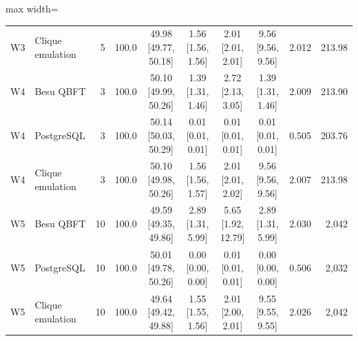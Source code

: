 \begin{table}[t]
\begin{adjustbox}{max width=\textwidth}
\begin{tabular}{llrrcccccr}
W3 & Clique emulation & 5 & 100.0 & 49.98 [49.77, 50.18] & 1.56 [1.56, 1.56] & 2.01 [2.01, 2.01] & 9.56 [9.56, 9.56] & 2.012 & 213.98 \\
W4 & Besu QBFT & 3 & 100.0 & 50.10 [49.99, 50.26] & 1.39 [1.31, 1.46] & 2.72 [2.13, 3.05] & 1.39 [1.31, 1.46] & 2.009 & 213.90 \\
W4 & PostgreSQL & 3 & 100.0 & 50.14 [50.03, 50.29] & 0.01 [0.01, 0.01] & 0.01 [0.01, 0.01] & 0.01 [0.01, 0.01] & 0.505 & 203.76 \\
W4 & Clique emulation & 3 & 100.0 & 50.10 [49.98, 50.26] & 1.56 [1.56, 1.57] & 2.01 [2.01, 2.02] & 9.56 [9.56, 9.56] & 2.007 & 213.98 \\
W5 & Besu QBFT & 10 & 100.0 & 49.59 [49.35, 49.86] & 2.89 [1.31, 5.99] & 5.65 [1.92, 12.79] & 2.89 [1.31, 5.99] & 2.030 & 2,042 \\
W5 & PostgreSQL & 10 & 100.0 & 50.01 [49.78, 50.26] & 0.00 [0.00, 0.00] & 0.01 [0.01, 0.01] & 0.00 [0.00, 0.00] & 0.506 & 2,032 \\
W5 & Clique emulation & 10 & 100.0 & 49.64 [49.42, 49.88] & 1.55 [1.55, 1.56] & 2.01 [2.00, 2.01] & 9.55 [9.55, 9.55] & 2.026 & 2,042 \\
\bottomrule
\end{tabular}\end{adjustbox}
\end{table}

